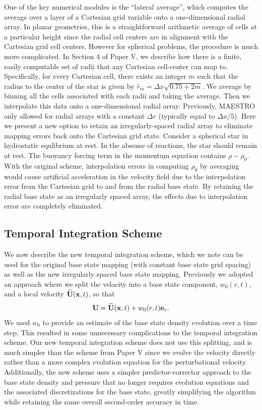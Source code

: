 One of the key numerical modules is the ``lateral average'', which computes the average over a 
layer of a Cartesian grid variable onto a one-dimensional radial array.
In planar geometries, this is a straightforward arithmetic average of cells at
a particular height since the radial cell centers are in alignment
with the Cartesian grid cell centers.
However for spherical problems, the procedure is much more complicated.
In Section 4 of Paper V, we describe how there is a finite, easily computable set of radii that any Cartesian cell-center can map to.  
Specifically, for every Cartesian cell, there exists an integer $m$ such that the radius to the center of the star is given by $\hat{r}_m=\Delta x\sqrt{0.75+2m}$.
We average by binning all the cells associated with each radii and taking the average.
Then we interpolate this data onto a one-dimensional radial array.  
Previously, MAESTRO only allowed for radial arrays with a constant $\Delta r$ (typically equal to $\Delta x/5$).
Here we present a new option to retain an irregularly-spaced radial array to eliminate mapping errors back onto the Cartesian grid state.
Consider a spherical star in hydrostatic equlibrium at rest.  In the absense of reactions, the star should remain at rest.
The buoyancy forcing term in the momentum equation contains $\rho-\rho_0$.  With the original scheme, interpolation errors in computing $\rho_0$ by averaging would cause artificial acceleration in the velocity field due to the interpolation error from the Cartesian grid to and from the radial base state.  By retaining the radial base state as an irregularly spaced array, the effects due to interpolation error are completely eliminated.

\subsection{Temporal Integration Scheme}\label{Sec:Temporal Integration Scheme}
We now describe the new temporal integration scheme, which we note can be used for the original base state mapping (with constant base state grid spacing) as well as the new irregularly spaced base state mapping.
Previously we adopted an approach where we split the velocity into a base state component, $w_0(r,t)$, 
and a local velocity $\widetilde{{\bf{U}}}({\bf{x}},t)$, so that
\begin{equation}
\Ub = \Ubt(\xb,t) + w_0(r,t)\eb_r.
\end{equation}
We used $w_0$ to provide an estimate of the base state density evolution over a time step.
This resulted in some unnecessary complications to the temporal integration scheme.
Our new temporal integration scheme does not use this splitting, and is much simpler than the scheme from Paper V since we evolve the velocity directly rather than a more complex evolution equation for the perturbational velocity.
Additionally, the new scheme uses a simpler predictor-corrector approach to the base state density and pressure that no longer requires evolution equations and the associated discretizations for the base state, greatly simplifying the algorithm while retaining the same overall second-order accuracy in time.

